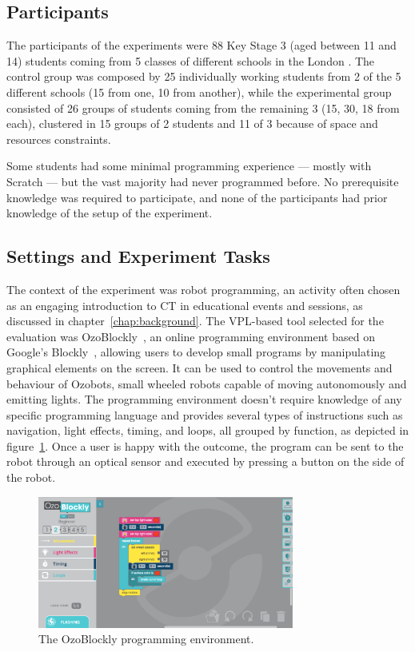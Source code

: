 \subsection{Participants}
The participants of the experiments were 88 Key Stage 3 (aged between 11 and 14) students coming from 5 classes of different schools in the London . The control group was composed by 25 individually working students from 2 of the 5 different schools (15 from one, 10 from another), while the experimental group consisted of 26 groups of students coming from the remaining 3 (15, 30, 18 from each), clustered in 15 groups of 2 students and 11 of 3 because of space and resources constraints.

Some students had some minimal programming experience --- mostly with Scratch --- but the vast majority had never programmed before. No prerequisite knowledge was required to participate, and none of the participants had prior knowledge of the setup of the experiment.

\subsection{Settings and Experiment Tasks}
The context of the experiment was robot programming, an activity often chosen as an engaging introduction to \ac{CT} in educational events and sessions, as discussed in chapter~\ref{chap:background}. The \ac{VPL}-based tool selected for the evaluation was OzoBlockly~\cite{OZOB}, an online programming environment based on Google's Blockly~\cite{BLOCKLY}, allowing users to develop small programs by manipulating graphical elements on the screen. It can be used to control the movements and behaviour of Ozobots, small wheeled robots capable of moving autonomously and emitting lights. The programming environment doesn't require knowledge of any specific programming language and provides several types of instructions such as navigation, light effects, timing, and loops, all grouped by function, as depicted in figure~\ref{fig:ozoblockly}. Once a user is happy with the outcome, the program can be sent to the robot through an optical sensor and executed by pressing a button on the side of the robot.

\begin{figure}[ht!]
  \centering
  \includegraphics[width=0.75\textwidth,trim={0 80 500 0},clip]{images/c3/OzoBlockly.png} 
  \caption{The OzoBlockly programming environment.}\label{fig:ozoblockly}
\end{figure}


